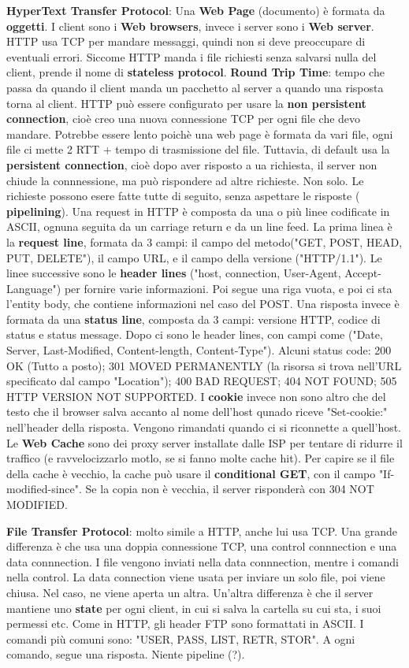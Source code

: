 \documentclass[a4paper,10pt]{article} %
\renewcommand{\b}[1]{%
    {\textbf{#1}}}
\begin{document}
\b{HyperText Transfer Protocol}: Una \b{Web Page} (documento) è formata da \b{oggetti}. I client sono i \b{Web browsers}, invece i server sono i \b{Web server}. HTTP usa TCP per mandare messaggi, quindi non si deve preoccupare di eventuali errori. Siccome HTTP manda i file richiesti senza salvarsi nulla del client, prende il nome di \b{stateless protocol}. 
\b{Round Trip Time}: tempo che passa da quando il client manda un pacchetto al server a quando una risposta torna al client.
HTTP può essere configurato per usare la \b{non persistent connection}, cioè creo una nuova connessione TCP per ogni file che devo mandare. Potrebbe essere lento poichè una web page è formata da vari file, ogni file ci mette 2 RTT + tempo di trasmissione del file. Tuttavia, di default usa la \b{persistent connection}, cioè dopo aver risposto a ua richiesta, il server non chiude la connnessione, ma può rispondere ad altre richieste. Non solo. Le richieste possono esere fatte tutte di seguito, senza aspettare le risposte (\b{pipelining}).
Una request in HTTP è composta da una o più linee codificate in ASCII, ognuna seguita da un carriage return e da un line feed. La prima linea è la \b{request line}, formata da 3 campi: il campo del metodo("GET, POST, HEAD, PUT, DELETE"), il campo URL, e il campo della versione ("HTTP/1.1"). Le linee successive sono le \b{header lines} ("host, connection, User-Agent, Accept-Language") per fornire varie informazioni. Poi segue una riga vuota, e poi ci sta l'entity body, che contiene informazioni nel caso del POST.
Una risposta invece è formata da una \b{status line}, composta da 3 campi: versione HTTP, codice di status e status message. Dopo ci sono le header lines, con campi come ("Date, Server, Last-Modified, Content-length, Content-Type"). Alcuni status code: 200 OK (Tutto a posto); 301 MOVED PERMANENTLY (la risorsa si trova nell'URL specificato dal campo "Location"); 400 BAD REQUEST; 404 NOT FOUND; 505 HTTP VERSION NOT SUPPORTED.
I \b{cookie} invece non sono altro che del testo che il browser salva accanto al nome dell'host qunado riceve "Set-cookie:" nell'header della risposta. Vengono rimandati quando ci si riconnette a quell'host. 
Le \b{Web Cache} sono dei proxy server installate dalle ISP per tentare di ridurre il traffico (e ravvelocizzarlo motlo, se si fanno molte cache hit). Per capire se il file della cache è vecchio, la cache può usare il \b{conditional GET}, con il campo "If-modified-since". Se la copia non è vecchia, il server risponderà con 304 NOT MODIFIED.


\b{File Transfer Protocol}: molto simile a HTTP, anche lui usa TCP. Una grande differenza è che usa una doppia connessione TCP, una control connnection e una data connnection. I file vengono inviati nella data connnection, mentre i comandi nella control. La data connection viene usata per inviare un solo file, poi viene chiusa. Nel caso, ne viene aperta un altra. Un'altra differenza è che il server mantiene uno \b{state} per ogni client, in cui si salva la cartella su cui sta, i suoi permessi etc.
Come in HTTP, gli header FTP sono formattati in ASCII. I comandi più comuni sono: "USER, PASS, LIST, RETR, STOR". A ogni comando, segue una risposta. Niente pipeline (?).
\end{document}
